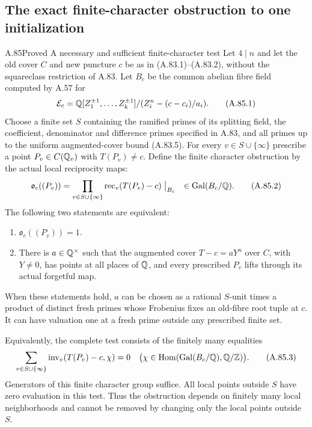\subsection{The exact finite-character obstruction to one initialization}

\begin{statement}{A.85}{Proved}
{A necessary and sufficient finite-character test}
Let $4\mid n$ and let the old cover $C$ and new puncture $c$
be as in (A.83.1)--(A.83.2), without the squareclass restriction
of A.83.  Let $B_c$ be the common abelian fibre field computed
by A.57 for
\[
 \mathcal E_c=\mathbb Q[Z_1^{\pm1},\ldots,Z_k^{\pm1}]
                         /(Z_i^n-(c-c_i)/a_i).
 \tag{A.85.1}
\]
Choose a finite set $S$ containing the ramified primes of its
splitting field, the coefficient, denominator and difference
primes specified in A.83, and all primes up to the uniform
augmented-cover bound (A.83.5).
For every $v\in S\cup\{\infty\}$ prescribe a point
$P_v\in C(\mathbb Q_v)$ with $T(P_v)\ne c$.
Define the finite character obstruction by the actual local
reciprocity maps:
\[
 \mathfrak o_c((P_v))=
   \prod_{v\in S\cup\{\infty\}}
      \operatorname{rec}_v(T(P_v)-c)\bigm|_{B_c}
                  \quad\in\operatorname{Gal}(B_c/\mathbb Q).
 \tag{A.85.2}
\]
The following two statements are equivalent:
\begin{enumerate}
\item $\mathfrak o_c((P_v))=1$.
\item There is $a\in\mathbb Q^\times$ such that the augmented cover
      $T-c=aY^n$ over $C$, with $Y\ne0$, has points at all
      places of $\mathbb Q$, and every prescribed $P_v$ lifts through
      its actual forgetful map.
\end{enumerate}
When these statements hold, $a$ can be chosen as a rational
$S$-unit times a product of distinct fresh primes whose
Frobenius fixes an old-fibre root tuple at $c$.  It can have
valuation one at a fresh prime outside any prescribed finite set.

Equivalently, the complete test consists of the finitely many
equalities
\[
 \sum_{v\in S\cup\{\infty\}}
   \operatorname{inv}_v(T(P_v)-c,\chi)=0
       \quad
 \bigl(\chi\in
       \operatorname{Hom}(\operatorname{Gal}(B_c/\mathbb Q),\mathbb Q/\mathbb Z)\bigr).
 \tag{A.85.3}
\]
Generators of this finite character group suffice.
All local points outside $S$ have zero evaluation in this
test.  Thus the obstruction depends on finitely many local
neighborhoods and cannot be removed by changing only the
local points outside $S$.
\end{statement}

